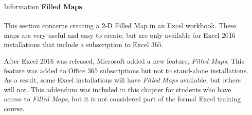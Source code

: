 \begin{center}
	\begin{infobox}{Information}
		\textbf{Filled Maps}
		\\
		\\
		This section concerns creating a 2-D Filled Map in an Excel workbook. These maps are very useful and easy to create, but are only available for Excel $ 2016 $ installations that include a subscription to Excel $ 365 $.
	\end{infobox}
\end{center}

After Excel $ 2016 $ was released, Microsoft added a new feature, \textit{Filled Maps}. This feature was added to Office 365 subscriptions but not to stand-alone installations. As a result, some Excel installations will have \textit{Filled Maps} available, but others will not. This addendum was included in this chapter for students who have access to \textit{Filled Maps}, but it is not considered part of the formal Excel training course.

